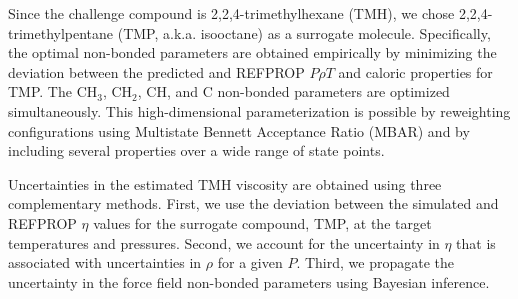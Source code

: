 \documentclass[11pt,a4paper]{article}
\begin{document}
	Since the challenge compound is 2,2,4-trimethylhexane (TMH), we chose 2,2,4-trimethylpentane (TMP, a.k.a. isooctane) as a surrogate molecule. Specifically, the optimal non-bonded parameters are obtained empirically by minimizing the deviation between the predicted and REFPROP $P\rho T$ and caloric properties for TMP. The CH$_3$, CH$_2$, CH, and C non-bonded parameters are optimized simultaneously. This high-dimensional parameterization is possible by reweighting configurations using Multistate Bennett Acceptance Ratio (MBAR) and by including several properties over a wide range of state points.  
	
	Uncertainties in the estimated TMH viscosity are obtained using three complementary methods. First, we use the deviation between the simulated and REFPROP $\eta$ values for the surrogate compound, TMP, at the target temperatures and pressures. Second, we account for the uncertainty in $\eta$ that is associated with uncertainties in $\rho$ for a given $P$. Third, we propagate the uncertainty in the force field non-bonded parameters using Bayesian inference. 
	
\end{document}
